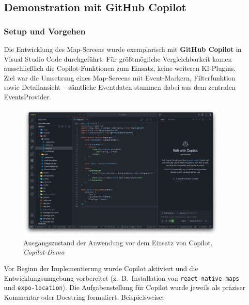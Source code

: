 
\subsection{Demonstration mit GitHub Copilot}

\subsubsection{Setup und Vorgehen}
Die Entwicklung des Map-Screens wurde exemplarisch mit \textbf{GitHub Copilot}
in Visual Studio Code durchgeführt. Für größtmögliche Vergleichbarkeit kamen
ausschließlich die Copilot-Funktionen zum Einsatz, keine weiteren KI-Plugins.
Ziel war die Umsetzung eines Map-Screens mit Event-Markern, Filterfunktion
sowie Detailansicht – sämtliche Eventdaten stammen dabei aus dem zentralen
EventsProvider.

\begin{figure}[htbp]
      \centering
      \includegraphics[width=0.95\textwidth]{images/copilot_screenshots/Screenshots Ist-Zustand-copilot.png}
      \caption{Ausgangszustand der Anwendung vor dem Einsatz von Copilot. \textit{Copilot-Demo}}
      \label{fig:copilot-istzustand}
\end{figure}

Vor Beginn der Implementierung wurde Copilot aktiviert und die
Entwicklungsumgebung vorbereitet (z.~B.\ Installation von
\texttt{react-native-maps} und \texttt{expo-location}). Die Aufgabenstellung
für Copilot wurde jeweils als präziser Kommentar oder Docstring formuliert.
Beispielsweise:

